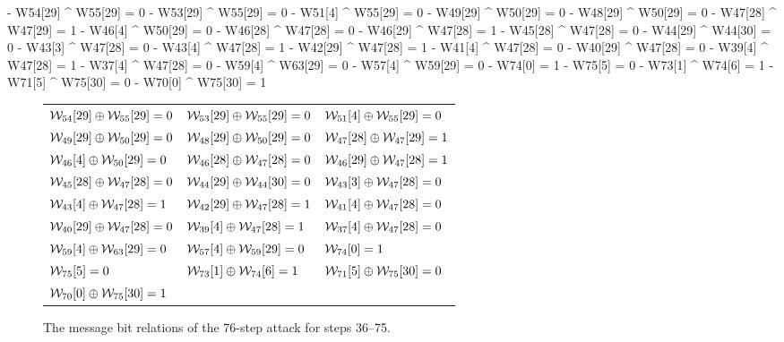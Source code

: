 \begingroup
\fontsize{8pt}{9pt}\selectfont
\begin{verbbox}
- W54[29] ^ W55[29] = 0
- W53[29] ^ W55[29] = 0
- W51[4] ^ W55[29] = 0
- W49[29] ^ W50[29] = 0
- W48[29] ^ W50[29] = 0
- W47[28] ^ W47[29] = 1
- W46[4] ^ W50[29] = 0
- W46[28] ^ W47[28] = 0
- W46[29] ^ W47[28] = 1
- W45[28] ^ W47[28] = 0
- W44[29] ^ W44[30] = 0
- W43[3] ^ W47[28] = 0
- W43[4] ^ W47[28] = 1
- W42[29] ^ W47[28] = 1
- W41[4] ^ W47[28] = 0
- W40[29] ^ W47[28] = 0
- W39[4] ^ W47[28] = 1
- W37[4] ^ W47[28] = 0
- W59[4] ^ W63[29] = 0
- W57[4] ^ W59[29] = 0
- W74[0] = 1
- W75[5] = 0
- W73[1] ^ W74[6] = 1
- W71[5] ^ W75[30] = 0
- W70[0] ^ W75[30] = 1
\end{verbbox}
\endgroup
\begin{figure}
\begin{center}
\begin{tabular}{l l l}
 $\mathcal{W}_{54}[29] \oplus \mathcal{W}_{55}[29] = 0$ & $\mathcal{W}_{53}[29] \oplus \mathcal{W}_{55}[29] = 0$ & $\mathcal{W}_{51}[4]  \oplus \mathcal{W}_{55}[29] = 0$\\
 $\mathcal{W}_{49}[29] \oplus \mathcal{W}_{50}[29] = 0$ & $\mathcal{W}_{48}[29] \oplus \mathcal{W}_{50}[29] = 0$ & $\mathcal{W}_{47}[28] \oplus \mathcal{W}_{47}[29] = 1$\\
 $\mathcal{W}_{46}[4]  \oplus \mathcal{W}_{50}[29] = 0$ & $\mathcal{W}_{46}[28] \oplus \mathcal{W}_{47}[28] = 0$ & $\mathcal{W}_{46}[29] \oplus \mathcal{W}_{47}[28] = 1$\\
 $\mathcal{W}_{45}[28] \oplus \mathcal{W}_{47}[28] = 0$ & $\mathcal{W}_{44}[29] \oplus \mathcal{W}_{44}[30] = 0$ & $\mathcal{W}_{43}[3]  \oplus \mathcal{W}_{47}[28] = 0$\\
 $\mathcal{W}_{43}[4]  \oplus \mathcal{W}_{47}[28] = 1$ & $\mathcal{W}_{42}[29] \oplus \mathcal{W}_{47}[28] = 1$ & $\mathcal{W}_{41}[4]  \oplus \mathcal{W}_{47}[28] = 0$\\
 $\mathcal{W}_{40}[29] \oplus \mathcal{W}_{47}[28] = 0$ & $\mathcal{W}_{39}[4]  \oplus \mathcal{W}_{47}[28] = 1$ & $\mathcal{W}_{37}[4]  \oplus \mathcal{W}_{47}[28] = 0$\\
 $\mathcal{W}_{59}[4]  \oplus \mathcal{W}_{63}[29] = 0$ & $\mathcal{W}_{57}[4]  \oplus \mathcal{W}_{59}[29] = 0$ & $\mathcal{W}_{74}[0] = 1$\\ 
 $\mathcal{W}_{75}[5] = 0$ & $\mathcal{W}_{73}[1]  \oplus \mathcal{W}_{74}[6] = 1$ & $\mathcal{W}_{71}[5]  \oplus \mathcal{W}_{75}[30] = 0$\\
 $\mathcal{W}_{70}[0]  \oplus \mathcal{W}_{75}[30] = 1$\\
\end{tabular}
\end{center}
  \caption{The message bit relations of the 76-step attack for steps 36--75.
  \label{fig:msgbitrel76}}
\end{figure}

